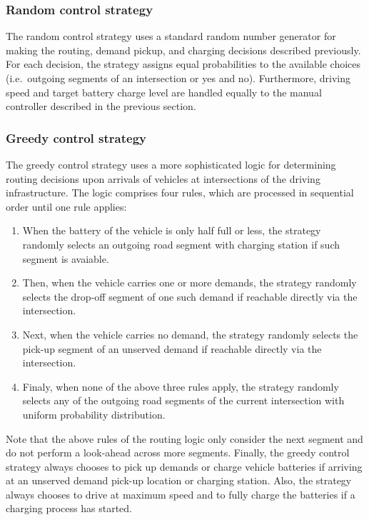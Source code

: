 \documentclass[a4paper,twoside]{article}
\begin{document}
	\subsubsection*{Random control strategy}
	\label{sec:controller-random}
	
	The random control strategy uses a standard random number generator for making the routing, demand pickup, and charging decisions described previously.
	For each decision, the strategy assigns equal probabilities to the available choices (i.e.\ outgoing segments of an intersection or yes and no).
	Furthermore, driving speed and target battery charge level are handled equally to the manual controller described in the previous section.
	
	\subsubsection*{Greedy control strategy}
	\label{sec:controller-greedy}
	
	The greedy control strategy uses a more sophisticated logic for determining routing decisions upon arrivals of vehicles at intersections of the driving infrastructure.
	The logic comprises four rules, which are processed in sequential order until one rule applies:
	\begin{enumerate}
		\item When the battery of the vehicle is only half full or less, the strategy randomly selects an outgoing road segment with charging station if such segment is avaiable.
		\item Then, when the vehicle carries one or more demands, the strategy randomly selects the drop-off segment of one such demand if reachable directly via the intersection.
		\item Next, when the vehicle carries no demand, the strategy randomly selects the pick-up segment of an unserved demand if reachable directly via the intersection.
		\item Finaly, when none of the above three rules apply, the strategy randomly selects any of the outgoing road segments of the current intersection with uniform probability distribution.
	\end{enumerate}
	Note that the above rules of the routing logic only consider the next segment and do not perform a look-ahead across more segments.
	Finally, the greedy control strategy always chooses to pick up demands or charge vehicle batteries if arriving at an unserved demand pick-up location or charging station.
	Also, the strategy always chooses to drive at maximum speed and to fully charge the batteries if a charging process has started.
	
\end{document}
